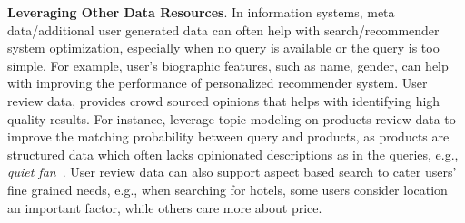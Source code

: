 \textbf{Leveraging Other Data Resources}. In information systems, meta data/additional user generated data can often help with search/recommender system optimization, especially when no query is available or the query is too simple. For example, user's biographic features, such as name, gender, can help with improving the performance of personalized recommender system. User review data, provides crowd sourced opinions that helps with identifying high quality results. For instance, leverage topic modeling on products review data to improve the matching probability between query and products, as products are structured data which often lacks opinionated descriptions as in the queries, e.g., \emph{quiet fan}~\cite{duan2013probabilistic}. User review data can also support aspect based search to cater users' fine grained needs, e.g., when searching for hotels, some users consider location an important factor, while others care more about price. 


